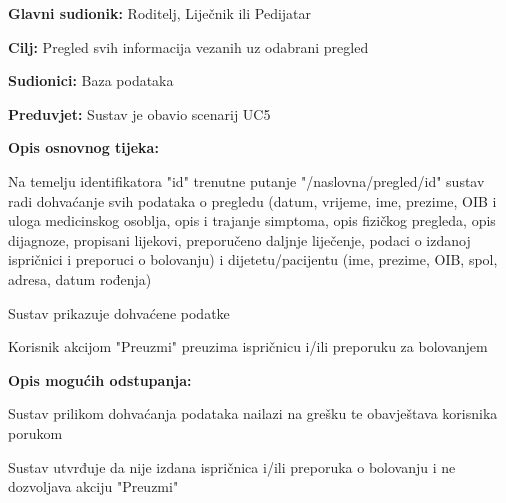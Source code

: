 				
				
				\noindent {}
				\begin{packed_item}
					
					\item \textbf{Glavni sudionik: }Roditelj, Liječnik ili Pedijatar
					\item  \textbf{Cilj:} Pregled svih informacija vezanih uz odabrani pregled
					\item  \textbf{Sudionici:} Baza podataka
					\item  \textbf{Preduvjet:} Sustav je obavio scenarij UC5
					\item  \textbf{Opis osnovnog tijeka:}
					
					\item[] \begin{packed_enum}
						\item Na temelju identifikatora "id" trenutne putanje "/naslovna/pregled/id" sustav radi dohvaćanje svih podataka o pregledu (datum, vrijeme, ime, prezime, OIB i uloga medicinskog osoblja, opis i trajanje simptoma, opis fizičkog pregleda, opis dijagnoze, propisani lijekovi, preporučeno daljnje liječenje, podaci o izdanoj ispričnici i preporuci o bolovanju) i dijetetu/pacijentu (ime, prezime, OIB, spol, adresa, datum rođenja)
						\item Sustav prikazuje dohvaćene podatke
						\item Korisnik akcijom "Preuzmi" preuzima ispričnicu i/ili preporuku za bolovanjem
					\end{packed_enum}
					
					\item  \textbf{Opis mogućih odstupanja:}
					
					\item[] \begin{packed_item}
						
						\item[1.a] Sustav prilikom dohvaćanja podataka nailazi na grešku te obavještava korisnika porukom
						
						\item[3.a] Sustav utvrđuje da nije izdana ispričnica i/ili preporuka o bolovanju i ne dozvoljava akciju "Preuzmi"			
					\end{packed_item}
					
				\end{packed_item}
				

